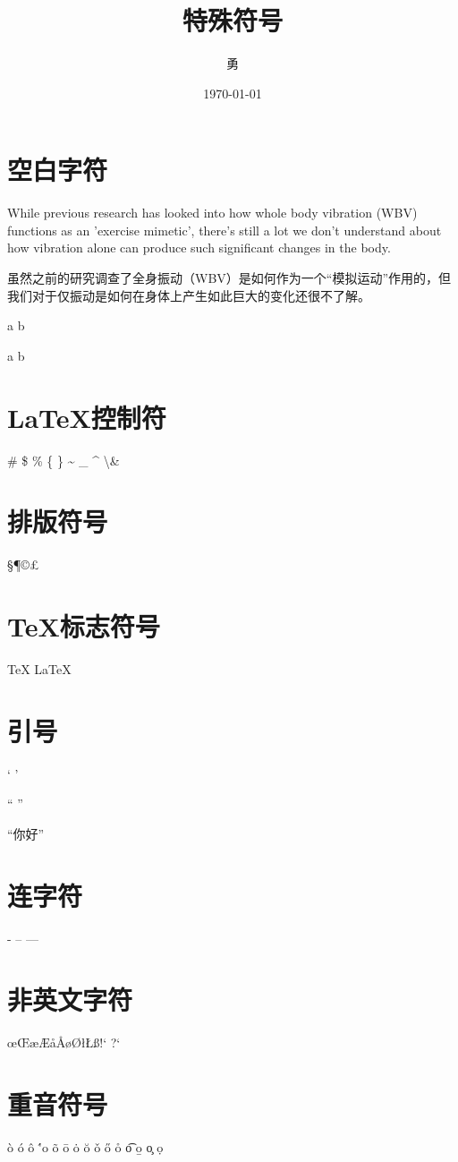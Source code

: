 \documentclass{article}
\title{特殊符号}
\author{勇}
\date{\today}
\begin{document}
	\maketitle
	\section{空白字符}
	While previous research has looked into how whole body vibration (WBV) functions as an 'exercise mimetic', there's still a lot we don't understand about how vibration alone can produce such significant changes in the body.
	
	虽然之前的研究调查了全身振动（WBV）是如何作为一个“模拟运动”作用的，但我们对于仅振动是如何在身体上产生如此巨大的变化还很不了解。
	
	a \quad b
	
	a \qquad b
	
	\section{\LaTeX 控制符}
	
	\# \$ \% \{ \} \~{} \_{} \^{} \textbackslash  \&
	
	\section{排版符号}
	
	\S \P \dag \ddag \copyright \pounds
	
	\section{\TeX 标志符号}
	
	\TeX{} \LaTeX{} \LaTeXe{}
	
	\section{引号}
	
	` '
	
	`` ''
	
	``你好''
	
	\section{连字符}
	
	- -- ---
	
	\section{非英文字符}
	
	\oe \OE \ae \AE \aa \AA \o \O \l \L \ss \SS !` ?`
	
	\section{重音符号}
	
	\`o \'o \^o \''o \~o \=o \.o \u{o} \v{o} \H{o} \r{o} \t{o} \b{o} \c{o} \d{o}
	
\end{document}
